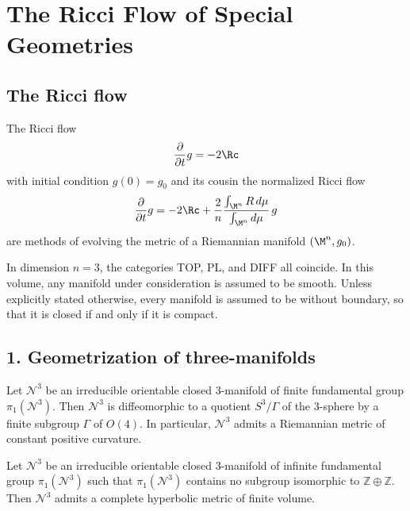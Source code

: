 \chapter{The Ricci Flow of Special Geometries}

\section*{The Ricci flow}

The Ricci flow
\[
\frac{\partial}{\partial t} g = -2 \Rc
\]
with initial condition $g(0)=g_0$ and its cousin the normalized Ricci flow
\[
\frac{\partial}{\partial t} g
= -2 \Rc + \frac{2}{n}\frac{\int_{\M^n} R\, d\mu}{\int_{\M^n} d\mu}\, g
\]
are methods of evolving the metric of a Riemannian manifold $(\M^n,g_0)$.

\begin{remark}
\label{ch01-rem-manifolds-smooth-boundaryless}

In dimension $n=3$, the categories TOP, PL, and DIFF all coincide. In this volume, any manifold under consideration is assumed to be smooth. Unless explicitly stated otherwise, every manifold is assumed to be without boundary, so that it is closed if and only if it is compact.
\end{remark}

\section*{1. Geometrization of three-manifolds}

\begin{conjecture}
\label{ch01-conj-elliptization}

Let $\mathcal{N}^3$ be an irreducible orientable closed $3$-manifold of finite fundamental group $\pi_1(\mathcal{N}^3)$. Then $\mathcal{N}^3$ is diffeomorphic to a quotient $S^3/\Gamma$ of the $3$-sphere by a finite subgroup $\Gamma$ of $O(4)$. In particular, $\mathcal{N}^3$ admits a Riemannian metric of constant positive curvature.
\end{conjecture}

\begin{conjecture}
\label{ch01-conj-hyperbolization}

Let $\mathcal{N}^3$ be an irreducible orientable closed $3$-manifold of infinite fundamental group $\pi_1(\mathcal{N}^3)$ such that $\pi_1(\mathcal{N}^3)$ contains no subgroup isomorphic to $\mathbb{Z}\oplus\mathbb{Z}$. Then $\mathcal{N}^3$ admits a complete hyperbolic metric of finite volume.
\end{conjecture}

